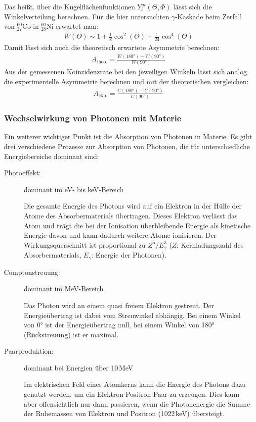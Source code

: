 Das heißt, über die Kugelflächenfunktionen $Y^m_l(\Theta,\Phi)$ lässt sich die Winkelverteilung berechnen. Für die hier untersuchten $\gamma$-Kaskade beim Zerfall von $^{60}_{27}$Co in $^{60}_{28}$Ni erwartet man:
\begin{align}
	\label{eq:korrelation}
	W(\Theta)\sim 1+\frac{1}{8}\cos^2(\Theta)+\frac{1}{24}\cos^4(\Theta)
\end{align}
Damit lässt sich auch die theoretisch erwartete Asymmetrie berechnen:
\begin{align}
	A_\text{theo.}=\frac{W(180\text{°})-W(90\text{°})}{W(90\text{°})}
\end{align}
Aus der gemessenen Koinzidenzrate bei den jeweiligen Winkeln lässt sich analog die experimentelle Asymmetrie berechnen und mit der theoretischen vergleichen:
\begin{align}
A_\text{exp.}=\frac{C(180\text{°})-C(90\text{°})}{C(90\text{°})}
\end{align}
\subsubsection{Wechselwirkung von Photonen mit Materie}

Ein weiterer wichtiger Punkt ist die Absorption von Photonen in Materie. Es gibt drei verschiedene Prozesse zur Absorption von Photonen, die für unterschiedliche Energiebereiche dominant sind:

\begin{description}
	\item[Photoeffekt:]\hfill
	dominant im eV- bis keV-Bereich
	
	Die gesamte Energie des Photons wird auf ein Elektron in der Hülle der Atome des Absorbermaterials übertragen. Dieses Elektron verlässt das Atom und trägt die bei der Ionisation überbleibende Energie als kinetische Energie davon und kann dadurch weitere Atome ionisieren. Der Wirkungsquerschnitt ist proportional zu $Z^5/E_\gamma^3$ ($Z$: Kernladungszahl des Absorbermaterials, $E_\gamma$: Energie der Photonen).
	
	\item[Comptonstreuung:]\hfill 
	dominant im MeV-Bereich
	
	Das Photon wird an einem quasi freiem Elektron gestreut. Der Energieübertrag ist dabei vom Streuwinkel abhängig. Bei einem Winkel von 0° ist der Energieübertrag null, bei einem Winkel von 180° (Rückstreuung) ist er maximal.
	
	\item[Paarproduktion:]\hfill 
	dominant bei Energien über 10\,MeV
	
	Im elektrischen Feld eines Atomkerns  kann die Energie des Photons dazu genutzt werden, um ein Elektron-Positron-Paar zu erzeugen. Dies kann aber offensichtlich nur dann passieren, wenn die Photonenergie die Summe der Ruhemassen von Elektron und Positron (1022\,keV) übersteigt.
\end{description}

